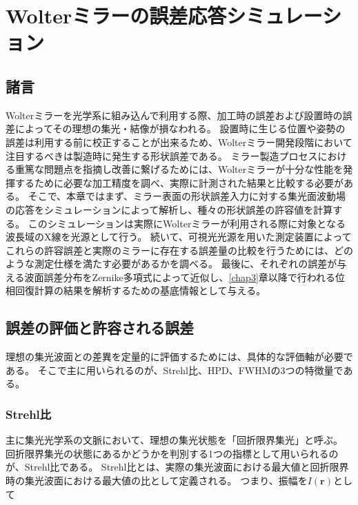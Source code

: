 \chapter{Wolterミラーの誤差応答シミュレーション}
\thispagestyle{empty}
\label{chap2}
\graphicspath{{chap2/figure/}}
\minitoc

\newpage


\section{諸言}
\label{chap2_introduction}

Wolterミラーを光学系に組み込んで利用する際、加工時の誤差および設置時の誤差によってその理想の集光・結像が損なわれる。
設置時に生じる位置や姿勢の誤差は利用する前に校正することが出来るため、Wolterミラー開発段階において注目するべきは製造時に発生する形状誤差である。
ミラー製造プロセスにおける重篤な問題点を指摘し改善に繋げるためには、Wolterミラーが十分な性能を発揮するために必要な加工精度を調べ、実際に計測された結果と比較する必要がある。
そこで、本章ではまず、ミラー表面の形状誤差入力に対する集光面波動場の応答をシミュレーションによって解析し、種々の形状誤差の許容値を計算する。
このシミュレーションは実際にWolterミラーが利用される際に対象となる波長域のX線を光源として行う。
続いて、可視光光源を用いた測定装置によってこれらの許容誤差と実際のミラーに存在する誤差量の比較を行うためには、どのような測定仕様を満たす必要があるかを調べる。
最後に、それぞれの誤差が与える波面誤差分布をZernike多項式によって近似し、\ref{chap3}章以降で行われる位相回復計算の結果を解析するための基底情報として与える。

\clearpage
\newpage
\section{誤差の評価と許容される誤差}
\label{chap2_beam_evaluation_standard}

理想の集光波面との差異を定量的に評価するためには、具体的な評価軸が必要である。
そこで主に用いられるのが、Strehl比、HPD、FWHMの3つの特徴量である。

\subsection{Strehl比}
\label{chap2_strehl_ratio}
主に集光光学系の文脈において、理想の集光状態を「回折限界集光」と呼ぶ。
回折限界集光の状態にあるかどうかを判別する1つの指標として用いられるのが、Strehl比である。
Strehl比とは、実際の集光波面における最大値と回折限界時の集光波面における最大値の比として定義される。
つまり、振幅を$I(\mathbf{r})$として

